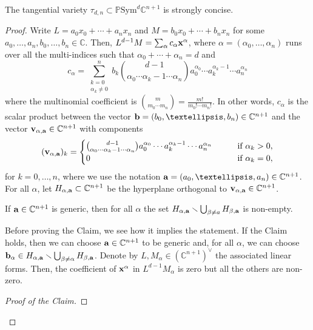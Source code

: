 \documentclass[10pt,a4paper]{amsart}
\newcommand{\Sym}{\mathrm{Sym}}
\newcommand{\bbC}{\mathbb{C}}
\newcommand{\bbP}{\mathbb{P}}
\begin{document}
\begin{lemma}
\label{lem:tangential}
    The tangential variety $\tau_{d,n} \subset \bbP \Sym^d\bbC^{n+1}$ is strongly concise.
\end{lemma}

\begin{proof}
    Write $L = a_0x_0+\cdots + a_nx_n$ and $M = b_0x_0 + \cdots + b_nx_n$ for some $a_0,\ldots,a_n,b_0,\ldots,b_n \in \bbC$. Then, $L^{d-1} M = \sum_{\alpha} c_\alpha {\bf x}^{\alpha}$, where $\alpha = (\alpha_0,\ldots,\alpha_n)$ runs over all the multi-indices such that $\alpha_0+\cdots+\alpha_n = d$ and
    \[
        c_\alpha = \sum_{\substack{k = 0 \\ \alpha_k \neq 0}}^n b_k \binom{d-1}{\alpha_0 \cdots \alpha_{k} -1 \cdots \alpha_n}a_0^{\alpha_0} \cdots a_k^{\alpha_k -1} \cdots a_n^{\alpha_n}
    \]
    where the multinomial coefficient is $\binom{m}{m_0\cdots m_n} = \frac{m!}{m_0! \cdots m_n!}$. In other words, $c_\alpha$ is the scalar product between the vector ${\bf b} = (b_0,\ldots,b_n) \in \bbC^{n+1}$ and the vector ${\bf v}_{\alpha, {\bf a}} \in \bbC^{n+1}$ with components
    \[
        ({\bf v}_{\alpha,{\bf a}})_k = \begin{cases}
            \binom{d-1}{\alpha_0 \cdots \alpha_{k} -1 \cdots \alpha_n}a_0^{\alpha_0} \cdots a_k^{\alpha_k -1} \cdots a_n^{\alpha_n} \qquad & \text{if } \alpha_k >0, \\
            0 & \text{if } \alpha_k = 0,
        \end{cases}
    \]
    for $k = 0,\ldots, n$, where we use the notation ${\bf a} = (a_0,\ldots,a_n) \in \bbC^{n+1}$. For all $\alpha$, let $H_{\alpha, {\bf a}} \subset \bbC^{n+1}$ be the hyperplane orthogonal to ${\bf v}_{\alpha,{\bf a}} \in \bbC^{n+1}$.
    \begin{claim}
        If ${\bf a} \in \bbC^{n+1}$ is generic, then for all $\alpha$ the set $H_{\alpha,{\bf a}} \smallsetminus \bigcup_{\beta \neq a} H_{\beta, {\bf a}}$ is non-empty.
    \end{claim}
    Before proving the Claim, we see how it implies the statement. If the Claim holds, then we can choose ${\bf a} \in \bbC^{n+1}$ to be generic and, for all $\alpha$, we can choose ${\bf b}_{\alpha} \in H_{\alpha,{\bf a}} \smallsetminus \bigcup_{\beta \neq \alpha} H_{\beta, {\bf a}}$. Denote by $L, M_{\alpha} \in (\bbC^{n+1})^\vee$ the associated linear forms. Then, the coefficient of ${\bf x}^\alpha$ in $L^{d-1}M_\alpha$ is zero but all the others are non-zero.
    \begin{proof}[Proof of the Claim]

\end{proof}
\end{proof}
\end{document}
